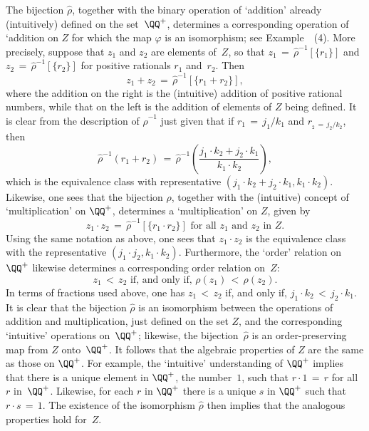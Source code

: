 {{        The bijection $\hat{{\rho}}$, together with the binary operation of `addition' already (intuitively) defined on the set~${\QQ}^{+}$,
    determines a corresponding operation of `addition on $Z$ for which the map ${\varphi}$ is an isomorphism; see Example~~(4).
    More precisely, suppose that $z_{1}$ and $z_{2}$ are elements of~$Z$,
    so that $z_{1} \,=\, \hat{{\rho}}^{-1}[\{r_{1}\}]$ and $z_{2} \,=\, \hat{{\rho}}^{-1}[\{r_{2}\}]$ for positive rationals $r_{1}$ and~$r_{2}$. Then
        \begin{displaymath}
        z_{1} + z_{2} \,=\, \hat{{\rho}}^{-1}[\{r_{1}+r_{2}\}],
        \end{displaymath}
    where the addition on the right is the (intuitive) addition of positive rational numbers,
    while that on the left is the addition of elements of $Z$ being defined.
    It is clear from the description of $\hat{{\rho}}^{-1}$ just given that if $r_{1} \,=\, j_{1}/k_{1}$ and $r_{_{2} \,=\, j_{2}/k_{2}}$,
    then 
        \begin{displaymath}
        \hat{{\rho}}^{-1}(r_{1} + r_{2})
    \,=\, 
        \hat{{\rho}}^{-1}\left(\frac{j_{1}{\cdot}k_{2} + j_{2}{\cdot}k_{1}}{k_{1}{\cdot}k_{2}}\right),
        \end{displaymath}
    which is the equivalence class with representative $(j_{1}{\cdot}k_{2} + j_{2}{\cdot}k_{1}, k_{1}{\cdot}k_{2})$.
    Likewise, one sees that the bijection ${\rho}$, together with the (intuitive) concept of `multiplication' on ${\QQ}^{+}$,
    determines a `multiplication' on $Z$, given by
        \begin{displaymath}
        z_{1}{\cdot}z_{2} \,=\, \hat{{\rho}}^{-1}[\{r_{1}{\cdot}r_{2}\}] \mbox{ for all $z_{1}$ and $z_{2}$ in $Z$}.
        \end{displaymath}
    Using the same notation as above, one sees that $z_{1}{\cdot}z_{2}$ is the equivalence class
    with the representative $(j_{1}{\cdot}j_{2}, k_{1}{\cdot}k_{2})$.
    Furthermore, the `order' relation on ${\QQ}^{+}$ likewise determines a corresponding order relation on~$Z$:
        \begin{displaymath}
        z_{1}\,<\,z_{2} \mbox{ if, and only if, } {\rho}(z_{1})\,<\,{\rho}(z_{2}).
        \end{displaymath}
    In terms of fractions used above, one has $z_{1}\,<\,z_{2}$ if, and only if, $j_{1}{\cdot}k_{2}\,<\,j_{2}{\cdot}k_{1}$.
    It is clear that the bijection $\hat{{\rho}}$ is an isomorphism between the operations of addition and multiplication,
    just defined on the set $Z$, and the corresponding `intuitive' operations on~${\QQ}^{+}$;
    likewise, the bijection~$\hat{{\rho}}$ is an order-preserving map from $Z$ onto~${\QQ}^{+}$.
    It follows that the algebraic properties of $Z$ are the same as those on ${\QQ}^{+}$.
    For example, the `intuitive' understanding of ${\QQ}^{+}$ implies that there is a unique element in ${\QQ}^{+}$, the number~$1$, such that $r{\cdot}1\,=\, r$
    for all $r$ in~${\QQ}^{+}$. Likewise, for each $r$ in ${\QQ}^{+}$ there is a unique $s$ in ${\QQ}^{+}$ such that $r{\cdot}s \,=\, 1$.
    The existence of the isomorphism $\hat{{\rho}}$ then implies that the analogous properties hold for~$Z$.

}}

